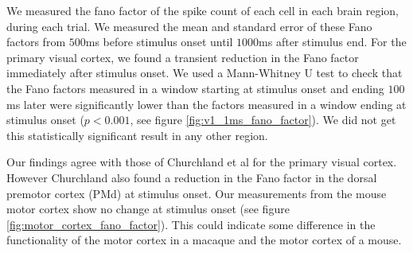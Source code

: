 \documentclass[a4paper,12pt]{article}
\theoremstyle{definition}
\begin{document}
  We measured the fano factor of the spike count of each cell in each brain region, during each trial. We measured the mean and standard error of these Fano factors from $500$ms before stimulus onset until $1000$ms after stimulus end. For the primary visual cortex, we found a transient reduction in the Fano factor immediately after stimulus onset. We used a Mann-Whitney U test to check that the Fano factors measured in a window starting at stimulus onset and ending $100$ms later were significantly lower than the factors measured in a window ending at stimulus onset ($p < 0.001$, see figure \ref{fig:v1_1ms_fano_factor}). We did not get this statistically significant result in any other region.

  Our findings agree with those of Churchland et al for the primary visual cortex. However Churchland also found a reduction in the Fano factor in the dorsal premotor cortex (PMd) at stimulus onset. Our measurements from the mouse motor cortex show no change at stimulus onset (see figure \ref{fig:motor_cortex_fano_factor}). This could indicate some difference in the functionality of the motor cortex in a macaque and the motor cortex of a mouse.

  \newpage
\end{document}
